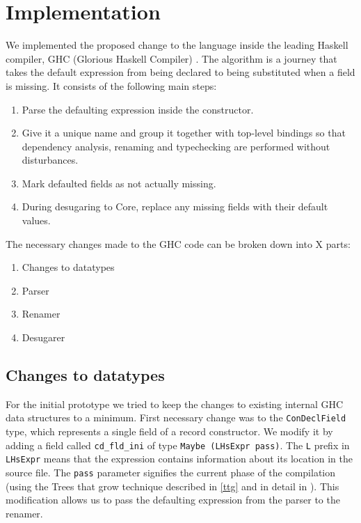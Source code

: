 \documentclass[en]{pracamgr}
\begin{document}
\chapter{Implementation}

We implemented the proposed change to the language inside the leading Haskell compiler, GHC (Glorious Haskell Compiler) \cite{HudakHaskell}.
The algorithm is a journey that takes the default expression from being declared to being substituted when a field is missing.
It consists of the following main steps:
\begin{enumerate}
  \item Parse the defaulting expression inside the constructor.
  \item Give it a unique name and group it together with top-level bindings so that dependency analysis, renaming and typechecking are performed without disturbances.
  \item Mark defaulted fields as not actually missing.
  \item During desugaring to Core, replace any missing fields with their default values.
\end{enumerate}

The necessary changes made to the GHC code can be broken down into X parts:
\begin{enumerate}
  \item Changes to datatypes
  \item Parser
  \item Renamer
  \item Desugarer
\end{enumerate}

\section{Changes to datatypes} 

For the initial prototype we tried to keep the changes to existing internal GHC data structures to a minimum.
First necessary change was to the \texttt{ConDeclField} type, which represents a single field of a record constructor.
We modify it by adding a field called \texttt{cd\_fld\_ini} of type \texttt{Maybe (LHsExpr pass)}. 
The \texttt{L} prefix in \texttt{LHsExpr} means that the expression contains information about its location in the source file.
The \texttt{pass} parameter signifies the current phase of the compilation (using the Trees that grow technique described in \ref{ttg} and in detail in \cite{Najd2017TreesTG}).
This modification allows us to pass the defaulting expression from the parser to the renamer.
\end{document}
